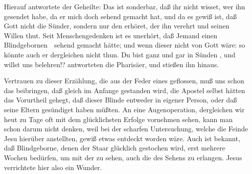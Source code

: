 \begin{aufza}
Hierauf antwortete der Geheilte: Das ist sonderbar, daß ihr nicht wisset, wer ihn gesendet habe, da er mich doch sehend gemacht hat, und da es gewiß ist, daß Gott nicht die Sünder, sondern nur den erhöret, der ihn verehrt und seinen Willen thut. Seit Menschengedenken ist es unerhört, daß Jemand einen Blindgebornen~\ sehend gemacht hätte; und wenn dieser nicht von Gott wäre: so könnte auch er dergleichen nicht thun. Du bist ganz und gar in Sünden , und willst uns belehren!? antworteten die Pharisäer, und stießen ihn hinaus.\par
Vertrauen zu dieser Erzählung, die aus der Feder eines  geflossen, muß uns schon das beibringen, daß gleich im Anfange gestanden wird, die Apostel selbst hätten das Vorurtheil gehegt, daß dieser Blinde entweder in eigener Person, oder daß seine Eltern gesündiget haben müßten. An eine Augenoperation, dergleichen wir heut zu Tage oft mit dem glücklichsten Erfolge vornehmen sehen, kann man schon darum nicht denken, weil bei der scharfen Untersuchung, welche die Feinde Jesu hierüber anstellten, gewiß etwas entdeckt worden wäre. Auch ist bekannt, daß Blindgeborne, denen der Staar glücklich gestochen wird, erst mehrere Wochen bedürfen, um mit der  zu sehen, auch die  des Sehens zu erlangen. Jesus verrichtete hier also ein  Wunder.

\end{aufza}

